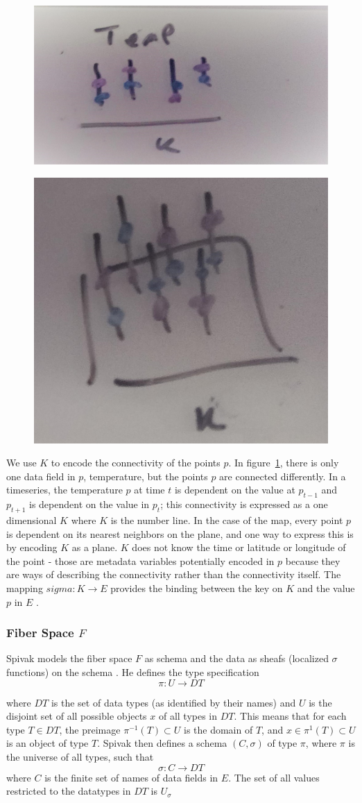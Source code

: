 \documentclass[../main.tex]{subfiles}
\begin{document}
\begin{figure}[ht]
    \includegraphics[width=0.2\linewidth]{figures/sections/math/temp_1k.png}
    \label{fig:k_data}
\end{figure}
\begin{figure}[ht]
    \includegraphics[width=0.2\linewidth]{figures/sections/math/temp_2k.png}
\end{figure}

We use $K$ to encode the connectivity of the points $p$. In figure~\ref{fig:k_data}, there is only one data field in $p$, temperature, but the points $p$ are connected differently. In a timeseries, the temperature $p$ at time $t$ is dependent on the value at $p_{t-1}$ and $p_{t+1}$ is dependent on the value in $p_t$; this connectivity is expressed as a one dimensional $K$ where $K$ is the number line. In the case of the map, every point $p$ is dependent on its nearest neighbors on the plane, and one way to express this is by encoding $K$ as a plane. $K$ does not know the time or latitude or longitude of the point - those are metadata variables potentially encoded in $p$ because they are ways of describing the connectivity rather than the connectivity itself. The mapping $sigma: K \rightarrow E$ provides the binding between the key on $K$ and the value $p$ in $E$ \cite{munznerChDataAbstraction}.

\subsubsection{Fiber Space $F$}
Spivak models the fiber space $F$ as schema and the data as sheafs (localized $\sigma$ functions) on the schema \cite{spivakSIMPLICIALDATABASES}. He defines the type specification 
\begin{equation}
\pi: U \rightarrow DT
\end{equation}

where $DT$ is the set of data types (as identified by their names) and $U$ is the disjoint set of all possible objects $x$ of all types in $DT$. This means that for each type $T\in DT$, the preimage $\pi^{-1}(T)\subset U $ is the domain of $T$, and $x \in \pi^{1}(T)\subset U$ is an object of type $T$. Spivak then defines a schema $(C, \sigma)$ of type $\pi$, where $\pi$ is the universe of all types, such that 
\begin{equation}
\sigma: C \rightarrow DT
\end{equation}
where $C$ is the finite set of names of data fields in $E$. The set of all values restricted to the datatypes in $DT$ is $U_{\sigma}$
\end{document}
